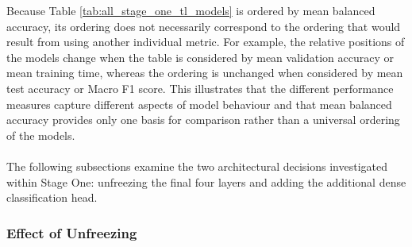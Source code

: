 \documentclass[12pt, a4paper]{report}
\let\oldsubsubsection\subsubsection
\renewcommand{\subsubsection}{%
    \Needspace{6\baselineskip}%
    \oldsubsubsection
}
\begin{document}
				Because Table \ref{tab:all_stage_one_tl_models} is ordered by mean balanced accuracy, its ordering does not necessarily correspond to the ordering that would result from using another individual metric. For example, the relative positions of the models change when the table is considered by mean validation accuracy or mean training time, whereas the ordering is unchanged when considered by mean test accuracy or Macro F1 score. This illustrates that the different performance measures capture different aspects of model behaviour and that mean balanced accuracy provides only one basis for comparison rather than a universal ordering of the models.\\\\
				The following subsections examine the two architectural decisions investigated within Stage One: unfreezing the final four layers and adding the additional dense classification head.
				
				\subsubsection{Effect of Unfreezing}
					
\end{document}

